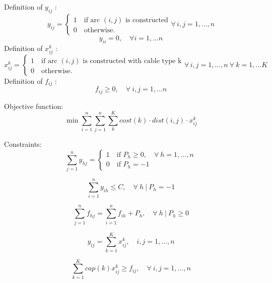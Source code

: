 Definition of $y_{ij}$ :
\[
	y_{ij} =
   \begin{cases}
   1 \quad \mbox{if arc } (i,j) \mbox{ is constructed} \\
   0 \quad \mbox{otherwise.} 
   \end{cases}
   \forall \,i,j = 1, ..., n 
\]
\[
	y_{ii} = 0, \quad \forall i= 1, ... n 
\]
Definition of $x^k_{ij}$ :
\[
	x^k_{ij} =
   \begin{cases}
   1 \quad \mbox{if arc } (i,j) \mbox{ is constructed with cable type k} \\
   0 \quad \mbox{otherwise.} 
   \end{cases}
   \forall \,i,j = 1, ..., n \ \forall \ k = 1,... K
\]
Definition of $f_{ij}$ :
\[
	f_{ij} \geq 0, \quad \forall \ i,j= 1, ... n
\]

Objective function: 
\begin{equation}\label{eq:obj}
	\min{\sum^n_{i=1} \sum^n_{j=1} \sum^K_{k} cost(k) \cdot dist(i,j) \cdot x^k_{ij}}
\end{equation}

Constraints: 
\begin{equation}\label{eq:numberCable}
	\sum^n_{j = 1} y_{hj} = 
	\begin{cases}
   1 \quad \mbox{if } P_h \geq 0, \quad \forall \ h=1,...,n \\
   0 \quad \mbox{if } P_h = -1
   \end{cases}
\end{equation}

\begin{equation}\label{eq:basestation}
	\sum^n_{i =1} y_{ih} \leq C, \quad \forall \ h \ | \ P_h = -1
\end{equation}

\begin{equation}\label{eq:flux}
	\sum^n_{j=1} f_{hj} = \sum^n_{i=1} f_{ih}+ P_h, \quad \forall \ h \ | \ P_h \geq 0
\end{equation}

\begin{equation}\label{eq:oneCable}
	y_{ij} = \sum^K_{k=1} x^k_{ij}, \quad i,j = 1,...,n
\end{equation}

\begin{equation}\label{eq:capacity}
	\sum^K_{k=1} cap(k)x^k_{ij} \geq f_{ij}, \quad \forall \ i,j = 1,...,n
\end{equation}

